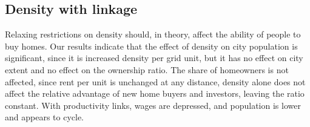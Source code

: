 \subsection{Density with linkage}
Relaxing restrictions on density should, in theory, affect the ability of people to buy homes. Our results indicate that the effect of density on city population is significant, since it is increased density per grid unit, but it has no effect on city extent and no effect on the ownership ratio. %
The share of homeowners is not affected, since rent per unit is unchanged at any distance, density alone does not affect the relative advantage of new home buyers and investors, leaving the ratio constant. %
With productivity links, wages are depressed, and population is lower and appears to cycle.

